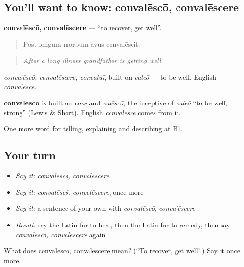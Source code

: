 \subsection*{You'll want to know: convalēscō, convalēscere}
\textbf{convalēscō, convalēscere} — \textquotedblleft{}to recover, get well\textquotedblright{}.

\begin{quote}
Post longum morbum avus convalēscit.
\end{quote}

\begin{quote}
\emph{After a long illness grandfather is getting well.}
\end{quote}

\emph{convalēscō, convalēscere, convaluī}, built on \emph{valeō} — to be well. English \emph{convalesce}.

\begin{cousinweb}
\textbf{convalēscō} is built on \emph{con-} and \emph{valēscō}, the inceptive of \emph{valeō} \textquotedblleft{}to be well, strong\textquotedblright{} (Lewis \& Short). English \emph{convalesce} comes from it.
\end{cousinweb}

\begin{grammarlens}[title={What you've built}]
One more word for telling, explaining and describing at B1.
\end{grammarlens}

\subsection*{Your turn}
\begin{itemize}
\raggedright
  \item \emph{Say it:} \emph{convalēscō, convalēscere}
  \item \emph{Say it:} \emph{convalēscō, convalēscere}, once more
  \item \emph{Say it:} a sentence of your own with \emph{convalēscō, convalēscere}
  \item \emph{Recall:} say the Latin for to heal, then the Latin for to remedy, then say \emph{convalēscō, convalēscere} again
\end{itemize}

\begin{tcolorbox}[breakable,colback=teal!4,colframe=teal!35!black,title={Before you move on}]
What does convalēscō, convalēscere mean? (\textquotedblleft{}To recover, get well\textquotedblright{}.) Say it once more.
\end{tcolorbox}
